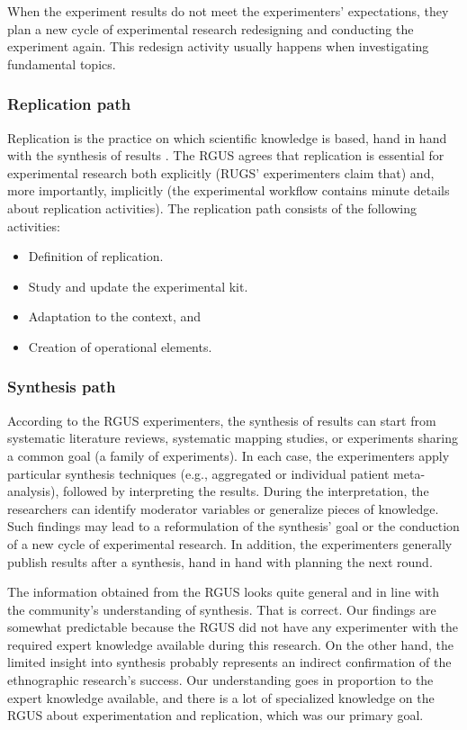 When the experiment results do not meet the experimenters' expectations, they plan a new cycle of experimental research redesigning and conducting the experiment again. This redesign activity usually happens when investigating fundamental topics.

\subsubsection{Replication path}
Replication is the practice on which scientific knowledge is based, hand in hand with the synthesis of results \cite{Roizer-2014-reproducibility}. The RGUS agrees that replication is essential for experimental research both explicitly (RUGS' experimenters claim that) and, more importantly, implicitly (the experimental workflow contains minute details about replication activities). The replication path consists of the following activities: 
\begin{itemize}
	\item Definition of replication.
	\item Study and update the experimental kit.
	\item Adaptation to the context, and
	\item Creation of operational elements.
\end{itemize}

\subsubsection{Synthesis path} 
According to the RGUS experimenters, the synthesis of results can start from systematic literature reviews, systematic mapping studies, or experiments sharing a common goal (a family of experiments). In each case, the experimenters apply particular synthesis techniques (e.g., aggregated or individual patient meta-analysis), followed by interpreting the results. During the interpretation, the researchers can identify moderator variables or generalize pieces of knowledge. Such findings may lead to a reformulation of the synthesis' goal or the conduction of a new cycle of experimental research. In addition, the experimenters generally publish results after a synthesis, hand in hand with planning the next round.

The information obtained from the RGUS looks quite general and in line with the community's understanding of synthesis. That is correct. Our findings are somewhat predictable because the RGUS did not have any experimenter with the required expert knowledge available during this research. On the other hand, the limited insight into synthesis probably represents an indirect confirmation of the ethnographic research's success. Our understanding goes in proportion to the expert knowledge available, and there is a lot of specialized knowledge on the RGUS about experimentation and replication, which was our primary goal. 

